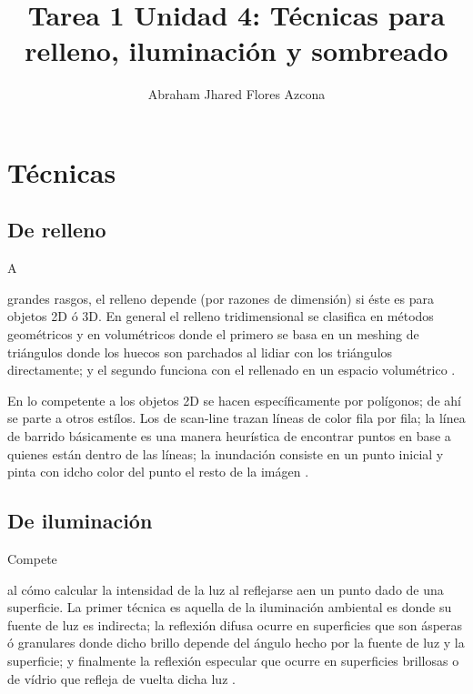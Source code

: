 \documentclass[stu, 12pt, letterpaper, donotrepeattitle, floatsintext, natbib]{apa7}
\title{\Large Tarea 1 Unidad 4: Técnicas para relleno, iluminación y sombreado}
\author{Abraham Jhared Flores Azcona} %
\affiliation{Instituto Tecnológico de Tijuana}
\begin{document}
    \maketitle

    \renewcommand\contentsname{Contenido}
    \tableofcontents

    \newpage
    \section{Técnicas}
    \subsection{De relleno}
    A \begin{justifying}
    grandes rasgos, el relleno depende (por razones de dimensión) si éste es para
    objetos 2D ó 3D. En general el relleno tridimensional se clasifica en métodos geométricos
    y en volumétricos donde el primero se basa en un meshing de triángulos donde los huecos son parchados
    al lidiar con los triángulos directamente; y el segundo funciona con el rellenado en un espacio volumétrico \citep{inproceedings}.\par %
  \end{justifying}
    En lo competente a los objetos 2D se hacen específicamente por polígonos; de ahí se parte a otros estílos.
    Los de scan-line trazan líneas de color fila por fila; la línea de barrido básicamente es una manera heurística
    de encontrar puntos en base a quienes están dentro de las líneas; la inundación consiste en un punto inicial
    y pinta con idcho color del punto el resto de la imágen \citep{unknown-author-no-dateA}.\par %
    \vspace{\baselineskip}
    \subsection{De iluminación}
    Compete \begin{justifying}
      al cómo calcular la intensidad de la luz al reflejarse aen un punto dado de una superficie. La primer técnica es aquella de
      la iluminación ambiental es donde su fuente de luz es indirecta; la reflexión difusa ocurre en superficies que son ásperas ó granulares
      donde dicho brillo depende del ángulo hecho por la fuente de luz y la superficie; y finalmente la reflexión especular que ocurre en superficies
      brillosas o de vídrio que refleja de vuelta dicha luz \citep{geeksforgeeks-2020}.\par %
    \end{justifying}
    \vspace{\baselineskip}
\end{document}
